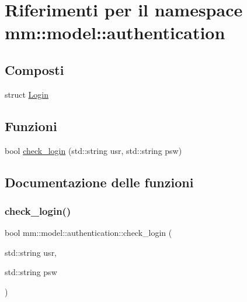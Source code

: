 \hypertarget{namespacemm_1_1model_1_1authentication}{}\section{Riferimenti per il namespace mm\+:\+:model\+:\+:authentication}
\label{namespacemm_1_1model_1_1authentication}
\subsection*{Composti}
\begin{DoxyCompactItemize}
\item 
struct \hyperlink{structmm_1_1model_1_1authentication_1_1_login}{Login}
\end{DoxyCompactItemize}
\subsection*{Funzioni}
\begin{DoxyCompactItemize}
\item 
bool \hyperlink{namespacemm_1_1model_1_1authentication_aeb56a39665f657663af73f37a6341f11}{check\+\_\+login} (std\+::string usr, std\+::string psw)
\end{DoxyCompactItemize}


\subsection{Documentazione delle funzioni}
\mbox{\label{namespacemm_1_1model_1_1authentication_aeb56a39665f657663af73f37a6341f11}} 
\subsubsection{\texorpdfstring{check\+\_\+login()}{check\_login()}}
{\footnotesize\ttfamily bool mm\+::model\+::authentication\+::check\+\_\+login (\begin{DoxyParamCaption}\item[{std\+::string}]{usr,  }\item[{std\+::string}]{psw }\end{DoxyParamCaption})}

